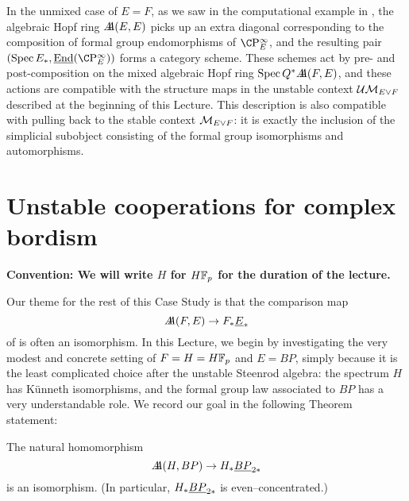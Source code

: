 \begin{remark}
In the unmixed case of $E = F$, as we saw in the computational example in , the algebraic Hopf ring $\AA(E, E)$ picks up an extra diagonal corresponding to the composition of formal group endomorphisms of $\CP^\infty_E$, and the resulting pair $(\Spec E_*, \underline{\operatorname{End}}(\CP^\infty_E))$ forms a category scheme.  These schemes act by pre- and post-composition on the mixed algebraic Hopf ring $\Spec Q^* \AA(F, E)$, and these actions are compatible with the structure maps in the unstable context $\Ucontext{E \vee F}$ described at the beginning of this Lecture.  This description is also compatible with pulling back to the stable context $\context{E \vee F}$: it is exactly the inclusion of the simplicial subobject consisting of the formal group isomorphisms and automorphisms.
\end{remark}













\section{Unstable cooperations for complex bordism}\label{COableCoopnsII}

\begin{center}
\textbf{Convention: We will write $H$ for $\HFp$ for the duration of the lecture.}
\end{center}

Our theme for the rest of this Case Study is that the comparison map \[\AA(F, E) \to F_* \OS{E}{*}\] of  is often an isomorphism.  In this Lecture, we begin by investigating the very modest and concrete setting of $F = H = \HFp$ and $E = BP$, simply because it is the least complicated choice after the unstable Steenrod algebra: the spectrum $H$ has K\"unneth isomorphisms, and the formal group law associated to $BP$ has a very understandable role.  We record our goal in the following Theorem statement:

\begin{theorem}\label{HFpBPCooperationsTheorem}
The natural homomorphism \[\AA(H, BP) \to H_* \OS{BP}{2*}\] is an isomorphism.  (In particular, $H_* \OS{BP}{2*}$ is even--concentrated.)
\end{theorem}

